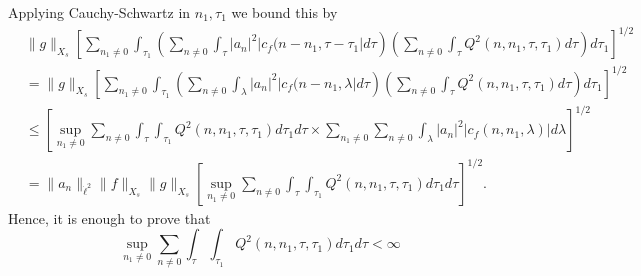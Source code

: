 \documentclass[12pt,reqno]{amsart}
\numberwithin{equation}{section}  %
\begin{document}
%
%
Applying Cauchy-Schwartz in $n_{1}, \tau_{1}$ we bound this by
%
%
\begin{equation*}
\begin{split}
& \| g \|_{X_{s}} \left[ \sum_{n_{1} \neq 0} \int_{\tau_{1}}\left( \sum_{n \neq 0} \int_{\tau} | a_{n} |^{2} | c_{f}(n -n_{1}, \tau - \tau_{1} | d \tau \right) \left( \sum_{n \neq 0} \int_{\tau} Q^{2}(n, n_{1}, \tau, \tau_{1}) d \tau \right) d \tau_{1} \right]^{1/2}
\\
& = \| g \|_{X_{s}} \left[ \sum_{n_{1} \neq 0} \int_{\tau_{1}}\left( \sum_{n \neq 0} \int_{\lambda} | a_{n} |^{2} | c_{f}(n -n_{1}, \lambda | d \tau \right) \left( \sum_{n \neq 0} \int_{\tau} Q^{2}(n, n_{1}, \tau, \tau_{1}) d \tau \right) d \tau_{1} \right]^{1/2}
\\
& \le \left[ \sup_{n_{1} \neq 0} \sum_{n \neq 0} \int_{\tau} \int_{\tau_{1}} Q^{2}(n, n_{1}, \tau, \tau_{1}) d \tau_{1} d \tau \times \sum_{n_{1}\neq 0} \sum_{n \neq 0} \int_{\lambda} | a_{n} |^{2} | c_{f}(n, n_{1}, \lambda) | d \lambda \right]^{1/2}
\\
& = \| a_{n} \|_{\dot{\ell}^{2}} \| f \|_{X_{s}} \| g \|_{X_{s}}
\left[ \sup_{n_{1} \neq 0} \sum_{n \neq 0} \int_{\tau} \int_{\tau_{1}} Q^{2}(n, n_{1}, \tau, \tau_{1}) d \tau_{1} d \tau \right ]^{1/2}.
\end{split}
\end{equation*}
%
%
Hence, it is enough to prove that
\[ \sup_{n_{1} \neq 0} \sum_{n \neq 0} \int_{\tau} \int_{\tau_{1}} Q^{2}(n, n_{1}, \tau, \tau_{1}) d \tau_{1} d \tau < \infty \]
%
%
%
%
%
%
%
\end{document}
